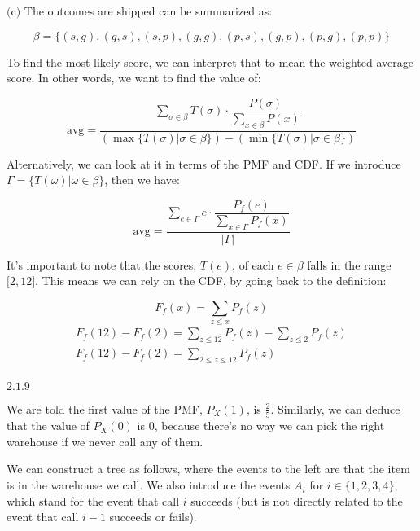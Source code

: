 \documentclass{article}
\newcommand{\problem}[2]{$\boxed{\text{#1.#2}}$}
\newcommand{\subproblem}[3]{$\boxed{\text{(#3)}}$}
\begin{document}
%
\subproblem{2.1}{7}{c} The outcomes are shipped can be summarized as:

\[
\beta=\{(s,g),(g,s),(s,p),(g,g),(p,s),(g,p),(p,g),(p,p)\}
\]

To find the most likely score, we can interpret that to mean the
weighted average score. In other words, we want to find the value of:

\[
\text{avg}=
\dfrac
    {\sum\limits_{\sigma\in\beta}T(\sigma)\cdot \dfrac{P(\sigma)}{\sum\limits_{x\in\beta}P(x)} }
    {(\max\{T(\sigma)|\sigma\in\beta\})-(\min\{T(\sigma)|\sigma\in\beta\})}
\]

Alternatively, we can look at it in terms of the PMF and CDF. If we
introduce $\Gamma=\{T(\omega)|\omega\in\beta\}$, then we have:

\[
\text{avg}=
\dfrac
    {\sum\limits_{e\in\Gamma}e\cdot \dfrac{P_f(e)}{\sum\limits_{x\in\Gamma}P_f(x)}}
    {|\Gamma|}
\]

It's important to note that the scores, $T(e)$, of each $e\in\beta$
falls in the range $\lbrack{}2,12\rbrack$. This means we can rely on
the CDF, by going back to the definition:



\[
F_f(x)=\sum\limits_{z\le x}P_f(z)
\] \[
\begin{array}{l}
F_f(12)-F_f(2)=\sum\limits_{z\le 12}P_f(z)-\sum\limits_{z\le 2}P_f(z) \\
F_f(12)-F_f(2)=\sum\limits_{2\le z\le 12}P_f(z) \\
\end{array}
\]

%
\problem{2.1}{9}

We are told the first value of the PMF, $P_X(1)$, is
$\frac{2}{5}$. Similarly, we can deduce that the value of $P_X(0)$ is
$0$, because there's no way we can pick the right warehouse if we
never call any of them.

We can construct a tree as follows, where the events to the left are
that the item is in the warehouse we call. We also introduce the
events $A_i$ for $i\in\{1,2,3,4\}$, which stand for the event that
call $i$ succeeds (but is not directly related to the event that call
$i-1$ succeeds or fails).

\begin{center}
\end{center}
\end{document}
